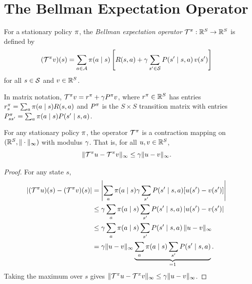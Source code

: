 \documentclass[11pt,a4paper]{article}
\begin{document}
\section{The Bellman Expectation Operator}
\label{sec:bellman-expectation-op}

\begin{definition}
\label{def:bellman-exp-op}
For a stationary policy $\pi$, the \emph{Bellman expectation
operator} $\mathcal{T}^\pi : \mathbb{R}^S \to \mathbb{R}^S$ is defined by
\[
    (\mathcal{T}^\pi v)(s) = \sum_{a \in \mathcal{A}} \pi(a \mid s)
    \left[ R(s,a) + \gamma \sum_{s' \in \mathcal{S}} P(s' \mid s,a)\,
    v(s') \right]
\]
for all $s \in \mathcal{S}$ and $v \in \mathbb{R}^S$.
\end{definition}

\begin{remark}
\label{rem:matrix-form}
In matrix notation, $\mathcal{T}^\pi v = r^\pi + \gamma
P^\pi v$, where $r^\pi \in \mathbb{R}^S$ has entries
$r^\pi_s = \sum_a \pi(a \mid s) R(s,a)$ and $P^\pi$ is
the $S \times S$ transition matrix with entries
$P^\pi_{ss'} = \sum_a \pi(a \mid s) P(s' \mid s,a)$.
\end{remark}

\begin{theorem}
\label{thm:bellman-exp-contraction}
For any stationary policy $\pi$, the operator $\mathcal{T}^\pi$
is a contraction mapping on $(\mathbb{R}^S, \|\cdot\|_\infty)$ with modulus
$\gamma$. That is, for all $u, v \in \mathbb{R}^S$,
\[
    \|\mathcal{T}^\pi u - \mathcal{T}^\pi v\|_\infty
    \leq \gamma \|u - v\|_\infty.
\]
\end{theorem}

\begin{proof}
For any state $s$,
\begin{align*}
    |(\mathcal{T}^\pi u)(s) - (\mathcal{T}^\pi v)(s)|
    &= \left| \sum_a \pi(a \mid s) \gamma \sum_{s'}
       P(s' \mid s,a) [u(s') - v(s')] \right| \\
    &\leq \gamma \sum_a \pi(a \mid s) \sum_{s'}
       P(s' \mid s,a)\, |u(s') - v(s')| \\
    &\leq \gamma \sum_a \pi(a \mid s) \sum_{s'}
       P(s' \mid s,a)\, \|u - v\|_\infty \\
    &= \gamma \|u - v\|_\infty
       \underbrace{\sum_a \pi(a \mid s) \sum_{s'}
       P(s' \mid s,a)}_{= 1}.
\end{align*}
Taking the maximum over $s$ gives
$\|\mathcal{T}^\pi u - \mathcal{T}^\pi v\|_\infty \leq
\gamma \|u - v\|_\infty$.
\end{proof}
\end{document}
